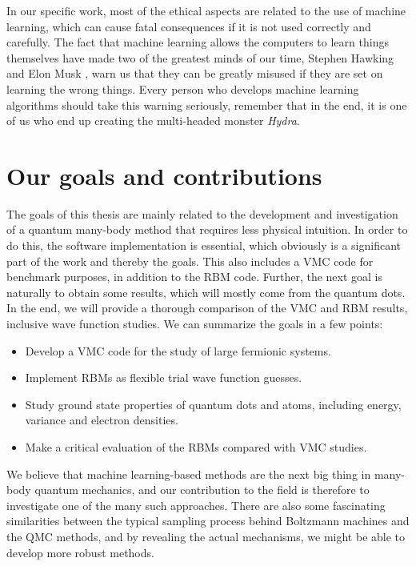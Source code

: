 In our specific work, most of the ethical aspects are related to the use of machine learning, which can cause fatal consequences if it is not used correctly and carefully. The fact that machine learning allows the computers to learn things themselves have made two of the greatest minds of our time, Stephen Hawking \cite{cellan-jones_hawking:_2014} and Elon Musk \cite{vance_elon_2015}, warn us that they can be greatly misused if they are set on learning the wrong things. Every person who develops machine learning algorithms should take this warning seriously, remember that in the end, it is one of us who end up creating the multi-headed monster \textit{Hydra}.

\section{Our goals and contributions} \label{sec:goals}
The goals of this thesis are mainly related to the development and investigation of a quantum many-body method that requires less physical intuition. In order to do this, the software implementation is essential, which obviously is a significant part of the work and thereby the goals. This also includes a VMC code for benchmark purposes, in addition to the RBM code. Further, the next goal is naturally to obtain some results, which will mostly come from the quantum dots. In the end, we will provide a thorough comparison of the VMC and RBM results, inclusive wave function studies. We can summarize the goals in a few points:
\begin{itemize}
	\item Develop a VMC code for the study of large fermionic systems.
	\item Implement RBMs as flexible trial wave function guesses.
	\item Study ground state properties of quantum dots and atoms, including energy, variance and electron densities.
	\item Make a critical evaluation of the RBMs compared with VMC studies.
\end{itemize}

We believe that machine learning-based methods are the next big thing in many-body quantum mechanics, and our contribution to the field is therefore to investigate one of the many such approaches. There are also some fascinating similarities between the typical sampling process behind Boltzmann machines and the QMC methods, and by revealing the actual mechanisms, we might be able to develop more robust methods. 

